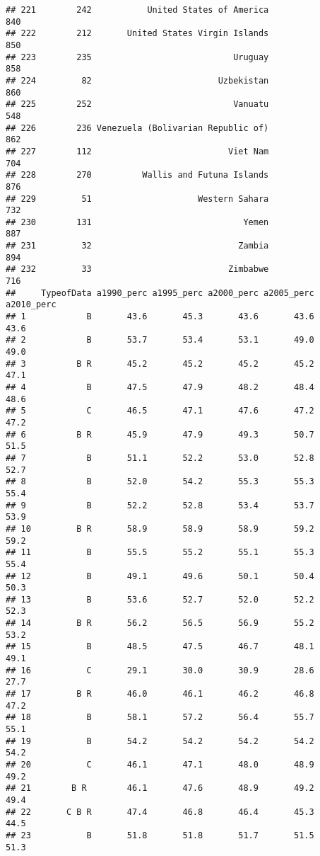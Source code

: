 \documentclass[]{article}
\begin{document}
\begin{verbatim}
## 221        242           United States of America                840
## 222        212       United States Virgin Islands                850
## 223        235                            Uruguay                858
## 224         82                         Uzbekistan                860
## 225        252                            Vanuatu                548
## 226        236 Venezuela (Bolivarian Republic of)                862
## 227        112                           Viet Nam                704
## 228        270          Wallis and Futuna Islands                876
## 229         51                     Western Sahara                732
## 230        131                              Yemen                887
## 231         32                             Zambia                894
## 232         33                           Zimbabwe                716
##     TypeofData a1990_perc a1995_perc a2000_perc a2005_perc a2010_perc
## 1            B       43.6       45.3       43.6       43.6       43.6
## 2            B       53.7       53.4       53.1       49.0       49.0
## 3          B R       45.2       45.2       45.2       45.2       47.1
## 4            B       47.5       47.9       48.2       48.4       48.6
## 5            C       46.5       47.1       47.6       47.2       47.2
## 6          B R       45.9       47.9       49.3       50.7       51.5
## 7            B       51.1       52.2       53.0       52.8       52.7
## 8            B       52.0       54.2       55.3       55.3       55.4
## 9            B       52.2       52.8       53.4       53.7       53.9
## 10         B R       58.9       58.9       58.9       59.2       59.2
## 11           B       55.5       55.2       55.1       55.3       55.4
## 12           B       49.1       49.6       50.1       50.4       50.3
## 13           B       53.6       52.7       52.0       52.2       52.3
## 14         B R       56.2       56.5       56.9       55.2       53.2
## 15           B       48.5       47.5       46.7       48.1       49.1
## 16           C       29.1       30.0       30.9       28.6       27.7
## 17         B R       46.0       46.1       46.2       46.8       47.2
## 18           B       58.1       57.2       56.4       55.7       55.1
## 19           B       54.2       54.2       54.2       54.2       54.2
## 20           C       46.1       47.1       48.0       48.9       49.2
## 21        B R        46.1       47.6       48.9       49.2       49.4
## 22       C B R       47.4       46.8       46.4       45.3       44.5
## 23           B       51.8       51.8       51.7       51.5       51.3

\end{verbatim}
\end{document}
